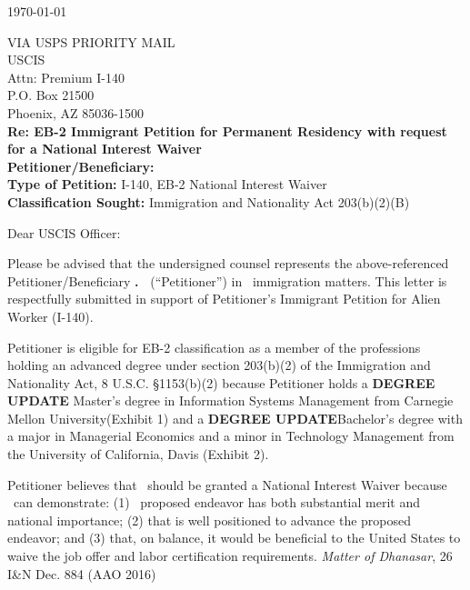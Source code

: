 \documentclass{pl_template}  %
\begin{document}
\firstpageheader


\begin{center}
    \today
\end{center}

\vspace{2em}
\raggedright{  %
VIA USPS PRIORITY MAIL\\
USCIS\\
Attn: Premium I-140\\
P.O. Box 21500\\ 
Phoenix, AZ 85036-1500\\
\vspace{2em}
\textbf{Re: EB-2 Immigrant Petition for Permanent Residency with request for a National Interest Waiver} \\
\textbf{Petitioner/Beneficiary:} \Petitioner\\
\textbf{Type of Petition:} I-140, EB-2 National Interest Waiver\\
\textbf{Classification Sought:}  Immigration and Nationality Act 203(b)(2)(B) \\
}

\vspace{3em}

\noindent Dear USCIS Officer:

\hspace*{2em} Please be advised that the undersigned counsel represents the above-referenced Petitioner/Beneficiary \textbf{\MrMs.\  \Petitioner} (“Petitioner”) in \HisHerLow \   immigration matters. This letter is respectfully submitted in support of Petitioner’s Immigrant Petition for Alien Worker (I-140).

\hspace*{2em}Petitioner is eligible for EB-2 classification as a member of the professions holding an advanced degree under section 203(b)(2) of the Immigration and Nationality Act, 8 U.S.C. §1153(b)(2) because Petitioner holds a \textbf{DEGREE UPDATE} Master's degree in Information Systems Management from Carnegie Mellon University(Exhibit 1) and a \textbf{DEGREE UPDATE}Bachelor’s degree with a major in Managerial Economics and a minor in Technology Management from the University of California, Davis (Exhibit 2).

\hspace*{2em}Petitioner believes that \HeSheLow \ should be granted a National Interest Waiver because \HeSheLow \  can demonstrate: (1) \HisHerLow \  proposed endeavor has both substantial merit and national importance; (2) that \HeSheLow is well positioned to advance the proposed endeavor; and (3) that, on balance, it would be beneficial to the United States to waive the job offer and labor certification requirements. \textit{Matter of Dhanasar}, 26 I\&N Dec. 884 (AAO 2016)
\end{document}
